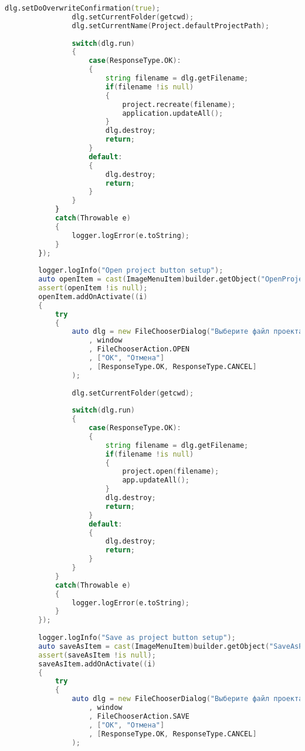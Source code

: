 \documentclass[russian,utf8,emptystyle]{eskdtext}
\begin{document}
\begin{lstlisting}[language=D]
                dlg.setDoOverwriteConfirmation(true);
                dlg.setCurrentFolder(getcwd);
                dlg.setCurrentName(Project.defaultProjectPath);
           
                switch(dlg.run)
                {
                    case(ResponseType.OK):
                    {
                        string filename = dlg.getFilename;
                        if(filename !is null)
                        {
                            project.recreate(filename);
                            application.updateAll();
                        }
                        dlg.destroy;
                        return;
                    }
                    default:
                    {
                        dlg.destroy;
                        return;
                    }
                } 
            }
            catch(Throwable e)
            {
                logger.logError(e.toString);
            }
        });
        
        logger.logInfo("Open project button setup");
        auto openItem = cast(ImageMenuItem)builder.getObject("OpenProjectMenuItem"~distinct);
        assert(openItem !is null);
        openItem.addOnActivate((i)
        {
            try
            {
                auto dlg = new FileChooserDialog("Выберите файл проекта"
                    , window
                    , FileChooserAction.OPEN
                    , ["OK", "Отмена"]
                    , [ResponseType.OK, ResponseType.CANCEL]
                );
                
                dlg.setCurrentFolder(getcwd);
           
                switch(dlg.run)
                {
                    case(ResponseType.OK):
                    {
                        string filename = dlg.getFilename;
                        if(filename !is null)
                        {
                            project.open(filename);
                            app.updateAll();
                        }
                        dlg.destroy;
                        return;
                    }
                    default:
                    {
                        dlg.destroy;
                        return;
                    }
                } 
            }
            catch(Throwable e)
            {
                logger.logError(e.toString);
            }
        });
        
        logger.logInfo("Save as project button setup");
        auto saveAsItem = cast(ImageMenuItem)builder.getObject("SaveAsProjectMenuItem"~distinct);
        assert(saveAsItem !is null);
        saveAsItem.addOnActivate((i)
        {
            try
            {
                auto dlg = new FileChooserDialog("Выберите файл проекта"
                    , window
                    , FileChooserAction.SAVE
                    , ["OK", "Отмена"]
                    , [ResponseType.OK, ResponseType.CANCEL]
                );
                

\end{lstlisting}
\end{document}
